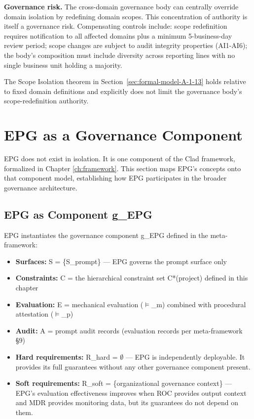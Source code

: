 \textbf{Governance risk.} The cross-domain governance body can centrally override domain isolation by redefining domain scopes. This concentration of authority is itself a governance risk. Compensating controls include: scope redefinition requires notification to all affected domains plus a minimum 5-business-day review period; scope changes are subject to audit integrity properties (AI1-AI6); the body's composition must include diversity across reporting lines with no single business unit holding a majority.

The Scope Isolation theorem in Section~\ref{sec:formal-model-A-1-13} holds relative to fixed domain definitions and explicitly does not limit the governance body's scope-redefinition authority.



\section{EPG as a Governance Component}
\label{sec:prompt-8}


EPG does not exist in isolation. It is one component of the Clad framework, formalized in Chapter \ref{ch:framework}. This section maps EPG's concepts onto that component model, establishing how EPG participates in the broader governance architecture.

\subsection{EPG as Component g\_EPG}


EPG instantiates the governance component g\_\allowbreak{}EPG defined in the meta-framework:

\begin{itemize}
  \item \textbf{Surfaces:} S = \{S\_\allowbreak{}prompt\} --- EPG governs the prompt surface only
  \item \textbf{Constraints:} C = the hierarchical constraint set C*(project) defined in this chapter
  \item \textbf{Evaluation:} E = mechanical evaluation ($\vDash$\_\allowbreak{}m) combined with procedural attestation ($\vDash$\_\allowbreak{}p)
  \item \textbf{Audit:} A = prompt audit records (evaluation records per meta-framework \S{}9)
  \item \textbf{Hard requirements:} R\_\allowbreak{}hard = $\emptyset$ --- EPG is independently deployable. It provides its full guarantees without any other governance component present.
  \item \textbf{Soft requirements:} R\_\allowbreak{}soft = \{organizational governance context\} --- EPG's evaluation effectiveness improves when ROC provides output context and MDR provides monitoring data, but its guarantees do not depend on them.
\end{itemize}


